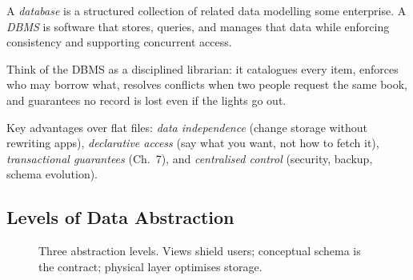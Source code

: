 \begin{definition}
A \emph{database} is a structured collection of related data modelling some enterprise. A \emph{DBMS} is software that stores, queries, and manages that data while enforcing consistency and supporting concurrent access.
\end{definition}

Think of the DBMS as a disciplined librarian: it catalogues every item, enforces who may borrow what, resolves conflicts when two people request the same book, and guarantees no record is lost even if the lights go out.

Key advantages over flat files: \emph{data independence} (change storage without rewriting apps), \emph{declarative access} (say what you want, not how to fetch it), \emph{transactional guarantees} (Ch.~7), and \emph{centralised control} (security, backup, schema evolution).

\subsection{Levels of Data Abstraction}

\begin{figure}[h]
\centering
{}
\caption{Three abstraction levels. Views shield users; conceptual schema is the contract; physical layer optimises storage.}
\label{fig:abstraction}
\end{figure}


